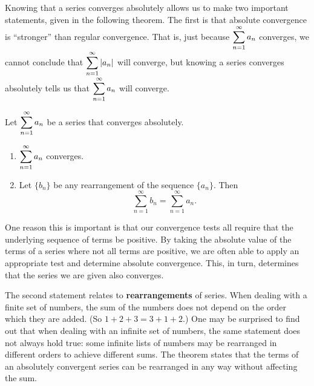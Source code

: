 Knowing that a series converges absolutely allows us to make two important statements, given in the following theorem. The first is that absolute convergence is  ``stronger'' than regular convergence.\vspace{-.5\baselineskip}
That is, just because {\small$\displaystyle \sum_{n=1}^\infty a_n$} converges, we cannot conclude that {\small$\displaystyle \sum_{n=1}^\infty \left\lvert a_n \right\rvert$} will converge, but knowing a series converges absolutely tells us that {\small$\displaystyle \sum_{n=1}^\infty a_n$} will converge. 

\begin{theorem}\label{thm:abs_convergence}%
Let $\displaystyle \sum_{n=1}^\infty a_n$ be a series that converges absolutely.
\begin{enumerate}
	\item $\displaystyle \sum_{n=1}^\infty a_n$ converges.
	\item	Let $\{b_n\}$ be any rearrangement of the sequence $\{a_n\}$. Then 
	\[\sum_{n=1}^\infty b_n = \sum_{n=1}^\infty a_n.\]
\end{enumerate}
\end{theorem}

One reason this is important is that our convergence tests all require that the underlying sequence of terms be positive. By taking the absolute value of the terms of a series where not all terms are positive, we are often able to apply an appropriate test and determine absolute convergence. This, in turn, determines that the series we are given also converges.

The second statement relates to \textbf{rearrangements} of series. When dealing with a finite set of numbers, the sum of the numbers does not depend on the order which they are added. (So $1+2+3 = 3+1+2$.) One may be surprised to find out that when dealing with an infinite set of numbers, the same statement does not always hold true: some infinite lists of numbers may be rearranged in different orders to achieve different sums. The theorem states that the terms of an absolutely convergent series can be rearranged in any way without affecting the sum.


